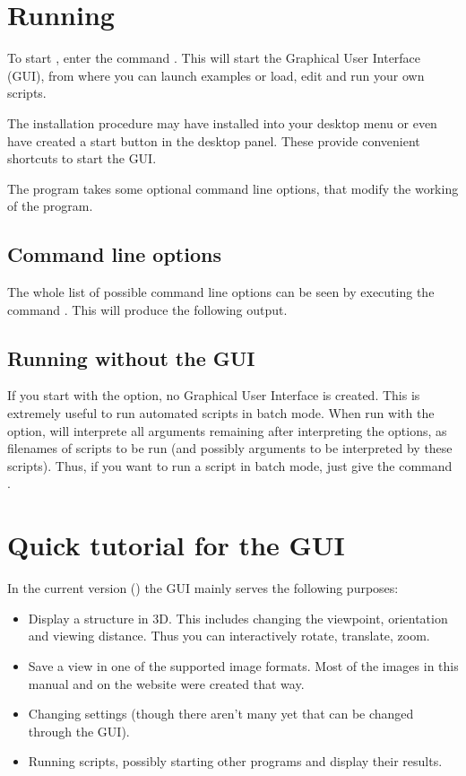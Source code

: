 \section{Running \pyformex}
\label{sec:running}
To start \pyf, enter the command . This will start the \pyf Graphical User Interface (GUI), from where you can launch examples or load, edit and run your own \pyf scripts.

The installation procedure may have installed \pyf into your desktop menu or even have created a start button in the desktop panel. These provide convenient shortcuts to start the \pyf GUI.

The \pyf program takes some optional command line options, that modify the working of the program.

\subsection{Command line options}
The whole list of possible command line options can be seen by executing the command . This will produce the following output.


\subsection{Running \pyFormex without the GUI}
If you start \pyf with the  option, no Graphical User Interface is created. This is extremely useful to run automated scripts in batch mode. When run with the  option, \pyf will interprete all arguments remaining after interpreting the options, as filenames of scripts to be run (and possibly arguments to be interpreted by these scripts).
Thus, if you want to run a \pyf script  in batch mode, just give the command .
 

\section{Quick tutorial for the \pyformex GUI}
\label{sec:gui-tutorial}
In the current version () the GUI mainly serves the following purposes:
\begin{itemize}
\item Display a structure in 3D. This includes changing the viewpoint, orientation and viewing distance. Thus you can interactively rotate, translate, zoom.
\item Save a view in one of the supported image formats. Most of the images in this manual and on the \pyformex{} website were created that way. 
\item Changing \pyformex settings (though there aren't many yet that can be changed through the GUI).
\item Running \pyformex scripts, possibly starting other programs and display their results.
\end{itemize}

